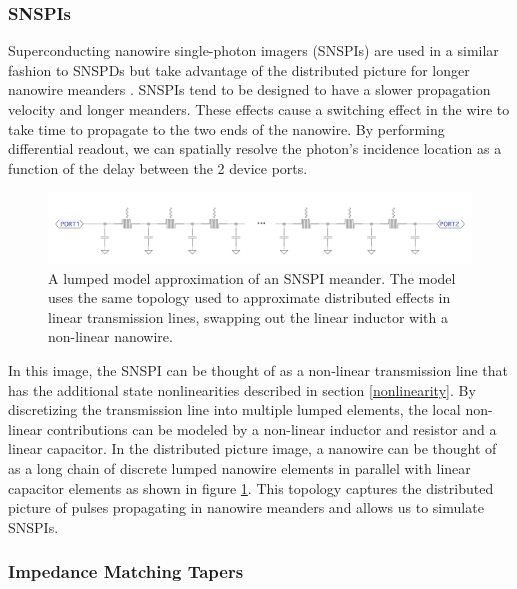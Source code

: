 \subsubsection{SNSPIs} \label{snspi_intro}

Superconducting nanowire single-photon imagers (SNSPIs) are used in a similar fashion
to SNSPDs but take advantage of the distributed picture for longer nanowire meanders
 \cite{snspi_paper}.
SNSPIs tend to be designed to have a slower propagation velocity and longer meanders.
These effects cause a switching effect in the wire to take time to propagate to the two 
ends of the nanowire. By performing differential readout, we can spatially resolve
the photon's incidence location as a function of the delay between the 2 device ports.

\begin{figure}
    \centering
    \includegraphics[width=\textwidth]{figs/snspi_meander.png}
    \caption{A lumped model approximation of an SNSPI meander. The model uses the same
    topology used to approximate distributed effects in linear transmission lines,
    swapping out the linear inductor with a non-linear nanowire.}
    \label{fig:snspi_tline}
\end{figure}

In this image, the SNSPI can be thought of as a non-linear transmission line that
has the additional state nonlinearities described in section \ref{nonlinearity}. By discretizing the transmission line
into multiple lumped elements, the local non-linear contributions can be modeled by a
non-linear inductor and resistor and a linear capacitor. In the distributed picture image,
a nanowire can be thought of as a long chain of discrete lumped nanowire elements in parallel
with linear capacitor elements as shown in figure \ref{fig:snspi_tline}. This topology captures the distributed picture of
pulses propagating in nanowire meanders and allows us to simulate SNSPIs.

\subsubsection{Impedance Matching Tapers} \label{tapers_intro}

